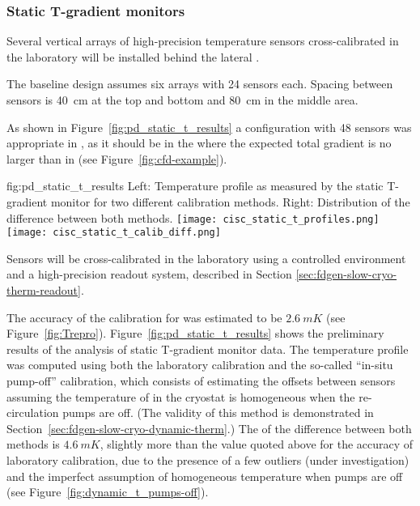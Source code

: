 
\subsubsection{Static T-gradient monitors}
\label{sec:fdgen-slow-cryo-static-therm}

Several vertical arrays of high-precision temperature sensors cross-calibrated in the laboratory will be installed behind the lateral .  

The baseline design assumes six arrays with \num{24} sensors each. 
Spacing between sensors
is \SI{40}{cm} at the top and bottom and \SI{80}{cm} in the middle area.

As shown in Figure~\ref{fig:pd_static_t_results} a configuration with \num{48} sensors was appropriate in , as it should be in the  where the expected total gradient is no larger than in  (see Figure~\ref{fig:cfd-example}). 

\begin{dunefigure}{fig:pd_static_t_results}{
 Left: Temperature profile as measured by the static T-gradient monitor for two different calibration methods. Right: Distribution of the difference between both methods.}
  \texttt{[image: cisc\_static\_t\_profiles.png]}%
  \texttt{[image: cisc\_static\_t\_calib\_diff.png]}%
\end{dunefigure}



Sensors will be cross-calibrated in the laboratory using a controlled environment and a high-precision readout system, described in Section \ref{sec:fdgen-slow-cryo-therm-readout}.

The accuracy of the calibration for  was estimated to be $\SI{2.6}{mK}$ (see Figure~\ref{fig:Trepro}). Figure~\ref{fig:pd_static_t_results} shows the preliminary results of the analysis of  static T-gradient monitor data. The temperature profile was computed using both the laboratory calibration and the so-called ``in-situ pump-off'' calibration, which consists %
of estimating the offsets between sensors assuming the temperature of \lar in the cryostat is homogeneous when the re-circulation pumps are off. (The validity of this method is demonstrated in Section~\ref{sec:fdgen-slow-cryo-dynamic-therm}.)  
The  of the difference between both methods is $\SI{4.6}{mK}$, slightly more than the value quoted above for the accuracy of laboratory calibration, due to the presence of a few outliers (under investigation) and the imperfect assumption of homogeneous temperature when pumps are off (see Figure~\ref{fig:dynamic_t_pumps-off}).  


